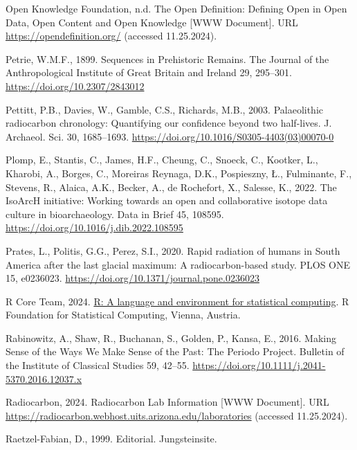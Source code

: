\documentclass[
  number,
  doubleblind]{elsarticle}
\newlength{\cslhangindent}
\newenvironment{CSLReferences}[2] %
 {\begin{list}{}{%
  \setlength{\itemindent}{0pt}
  \setlength{\leftmargin}{0pt}
  \setlength{\parsep}{0pt}
  \ifodd #1
   \setlength{\leftmargin}{\cslhangindent}
   \setlength{\itemindent}{-1\cslhangindent}
  \fi
  \setlength{\itemsep}{#2\baselineskip}}}
 {\end{list}}
\begin{document}
\begin{CSLReferences}{1}{0}
Open Knowledge Foundation, n.d. The {Open Definition}: {Defining Open}
in {Open Data}, {Open Content} and {Open Knowledge} {[}WWW Document{]}.
URL \url{https://opendefinition.org/} (accessed 11.25.2024).

Petrie, W.M.F., 1899. Sequences in {Prehistoric Remains}. The Journal of
the Anthropological Institute of Great Britain and Ireland 29, 295--301.
\url{https://doi.org/10.2307/2843012}

Pettitt, P.B., Davies, W., Gamble, C.S., Richards, M.B., 2003.
Palaeolithic radiocarbon chronology: Quantifying our confidence beyond
two half-lives. J. Archaeol. Sci. 30, 1685--1693.
\url{https://doi.org/10.1016/S0305-4403(03)00070-0}

Plomp, E., Stantis, C., James, H.F., Cheung, C., Snoeck, C., Kootker,
L., Kharobi, A., Borges, C., Moreiras Reynaga, D.K., Pospieszny, Ł.,
Fulminante, F., Stevens, R., Alaica, A.K., Becker, A., de Rochefort, X.,
Salesse, K., 2022. The {IsoArcH} initiative: {Working} towards an open
and collaborative isotope data culture in bioarchaeology. Data in Brief
45, 108595. \url{https://doi.org/10.1016/j.dib.2022.108595}

Prates, L., Politis, G.G., Perez, S.I., 2020. Rapid radiation of humans
in {South America} after the last glacial maximum: {A} radiocarbon-based
study. PLOS ONE 15, e0236023.
\url{https://doi.org/10.1371/journal.pone.0236023}

R Core Team, 2024. \href{https://www.R-project.org/}{R: A language and
environment for statistical computing}. R Foundation for Statistical
Computing, Vienna, Austria.

Rabinowitz, A., Shaw, R., Buchanan, S., Golden, P., Kansa, E., 2016.
Making {Sense} of the {Ways We Make Sense} of the {Past}: {The Periodo
Project}. Bulletin of the Institute of Classical Studies 59, 42--55.
\url{https://doi.org/10.1111/j.2041-5370.2016.12037.x}

Radiocarbon, 2024. Radiocarbon {Lab Information} {[}WWW Document{]}. URL
\url{https://radiocarbon.webhost.uits.arizona.edu/laboratories}
(accessed 11.25.2024).

Raetzel-Fabian, D., 1999. Editorial. Jungsteinsite.


\end{CSLReferences}
\end{document}
